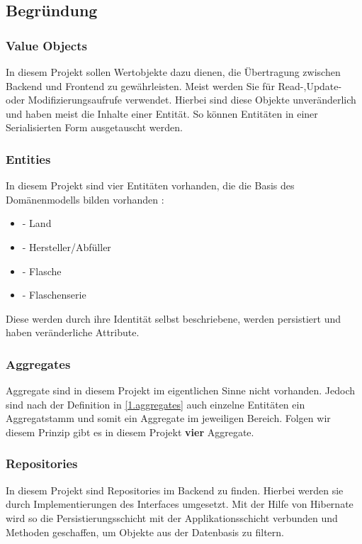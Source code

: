 		\subsection{Begründung}
		
			\subsubsection{Value Objects}
			In diesem Projekt sollen Wertobjekte dazu dienen, die Übertragung zwischen Backend und Frontend zu gewährleisten. Meist werden Sie für Read-,Update- oder Modifizierungsaufrufe verwendet. Hierbei sind diese  Objekte unveränderlich und haben meist die Inhalte einer Entität. So können Entitäten in einer Serialisierten Form ausgetauscht werden.
			
			\subsubsection{Entities}
			In diesem Projekt sind vier Entitäten vorhanden, die die Basis des Domänenmodells bilden vorhanden :
			\begin{itemize}
				\item {} - Land
				\item {} - Hersteller/Abfüller
				\item {} - Flasche
				\item {} - Flaschenserie
			\end{itemize}
			Diese werden durch ihre Identität selbst beschriebene, werden persistiert und haben veränderliche Attribute.
			
			\subsubsection{Aggregates}
			Aggregate sind in diesem Projekt im eigentlichen Sinne nicht vorhanden. Jedoch sind nach der Definition in \cref{1.aggregates} auch einzelne Entitäten ein Aggregatstamm und somit ein Aggregate im jeweiligen Bereich. Folgen wir diesem Prinzip gibt es in diesem Projekt \textbf{vier} Aggregate.
			
			\subsubsection{Repositories}
			In diesem Projekt sind Repositories im Backend zu finden. Hierbei werden sie durch Implementierungen des Interfaces  umgesetzt. Mit der Hilfe von Hibernate wird so die Persistierungsschicht mit der Applikationsschicht verbunden und Methoden geschaffen, um Objekte aus der Datenbasis zu filtern.
			
